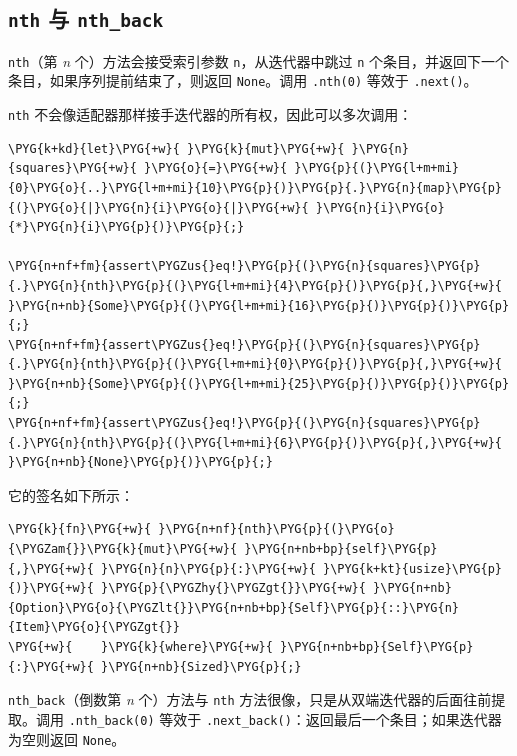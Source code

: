 \subsection{\texttt{nth} 与 \texttt{nth\_back}}

\texttt{nth}（第 \emph{n} 个）方法会接受索引参数 \texttt{n}，从迭代器中跳过 \texttt{n} 个条目，并返回下一个条目，如果序列提前结束了，则返回 \texttt{None}。调用 \texttt{.nth(0)} 等效于 \texttt{.next()}。

\texttt{nth} 不会像适配器那样接手迭代器的所有权，因此可以多次调用：

\begin{Verbatim}[commandchars=\\\{\},breaklines=true,breakanywhere=true,fontsize=\codefont,xleftmargin=17bp]
\PYG{k+kd}{let}\PYG{+w}{ }\PYG{k}{mut}\PYG{+w}{ }\PYG{n}{squares}\PYG{+w}{ }\PYG{o}{=}\PYG{+w}{ }\PYG{p}{(}\PYG{l+m+mi}{0}\PYG{o}{..}\PYG{l+m+mi}{10}\PYG{p}{)}\PYG{p}{.}\PYG{n}{map}\PYG{p}{(}\PYG{o}{|}\PYG{n}{i}\PYG{o}{|}\PYG{+w}{ }\PYG{n}{i}\PYG{o}{*}\PYG{n}{i}\PYG{p}{)}\PYG{p}{;}

\PYG{n+nf+fm}{assert\PYGZus{}eq!}\PYG{p}{(}\PYG{n}{squares}\PYG{p}{.}\PYG{n}{nth}\PYG{p}{(}\PYG{l+m+mi}{4}\PYG{p}{)}\PYG{p}{,}\PYG{+w}{ }\PYG{n+nb}{Some}\PYG{p}{(}\PYG{l+m+mi}{16}\PYG{p}{)}\PYG{p}{)}\PYG{p}{;}
\PYG{n+nf+fm}{assert\PYGZus{}eq!}\PYG{p}{(}\PYG{n}{squares}\PYG{p}{.}\PYG{n}{nth}\PYG{p}{(}\PYG{l+m+mi}{0}\PYG{p}{)}\PYG{p}{,}\PYG{+w}{ }\PYG{n+nb}{Some}\PYG{p}{(}\PYG{l+m+mi}{25}\PYG{p}{)}\PYG{p}{)}\PYG{p}{;}
\PYG{n+nf+fm}{assert\PYGZus{}eq!}\PYG{p}{(}\PYG{n}{squares}\PYG{p}{.}\PYG{n}{nth}\PYG{p}{(}\PYG{l+m+mi}{6}\PYG{p}{)}\PYG{p}{,}\PYG{+w}{ }\PYG{n+nb}{None}\PYG{p}{)}\PYG{p}{;}
\end{Verbatim}

它的签名如下所示：

\begin{Verbatim}[commandchars=\\\{\},breaklines=true,breakanywhere=true,fontsize=\codefont,xleftmargin=17bp]
\PYG{k}{fn}\PYG{+w}{ }\PYG{n+nf}{nth}\PYG{p}{(}\PYG{o}{\PYGZam{}}\PYG{k}{mut}\PYG{+w}{ }\PYG{n+nb+bp}{self}\PYG{p}{,}\PYG{+w}{ }\PYG{n}{n}\PYG{p}{:}\PYG{+w}{ }\PYG{k+kt}{usize}\PYG{p}{)}\PYG{+w}{ }\PYG{p}{\PYGZhy{}\PYGZgt{}}\PYG{+w}{ }\PYG{n+nb}{Option}\PYG{o}{\PYGZlt{}}\PYG{n+nb+bp}{Self}\PYG{p}{::}\PYG{n}{Item}\PYG{o}{\PYGZgt{}}
\PYG{+w}{    }\PYG{k}{where}\PYG{+w}{ }\PYG{n+nb+bp}{Self}\PYG{p}{:}\PYG{+w}{ }\PYG{n+nb}{Sized}\PYG{p}{;}
\end{Verbatim}

\texttt{nth\_back}（倒数第 \emph{n} 个）方法与 \texttt{nth} 方法很像，只是从双端迭代器的后面往前提取。调用 \texttt{.nth\_back(0)} 等效于 \texttt{.next\_back()}：返回最后一个条目；如果迭代器为空则返回 \texttt{None}。

